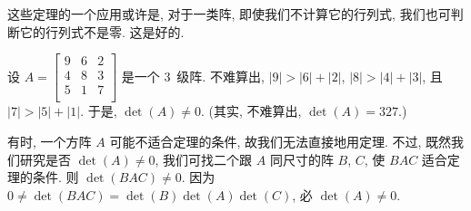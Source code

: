 这些定理的一个应用或许是,
对于一类阵,
即使我们不计算它的行列式,
我们也可判断它的行列式不是零.
这是好的.

\begin{example}\label{emp:NonzeroDet1}
    设 \(A =
    \begin{bmatrix}
        9 & 6 & 2 \\
        4 & 8 & 3 \\
        5 & 1 & 7 \\
    \end{bmatrix}\)
    是一个 \(3\)~级阵.
    不难算出, \(|9| > |6| + |2|\),
    \(|8| > |4| + |3|\),
    且 \(|7| > |5| + |1|\).
    于是, \(\det {(A)} \neq 0\).
    (其实, 不难算出, \(\det {(A)} = 327.\))
\end{example}

有时, 一个方阵 \(A\) 可能不适合定理的条件, 故我们无法直接地用定理.
不过, 既然我们研究是否 \(\det {(A)} \neq 0\),
我们可找二个跟 \(A\) 同尺寸的阵 \(B\), \(C\),
使 \(BAC\) 适合定理的条件.
则 \(\det {(BAC)} \neq 0\).
因为 \(0 \neq \det {(BAC)} = \det {(B)} \det {(A)} \det {(C)}\),
必 \(\det {(A)} \neq 0\).

